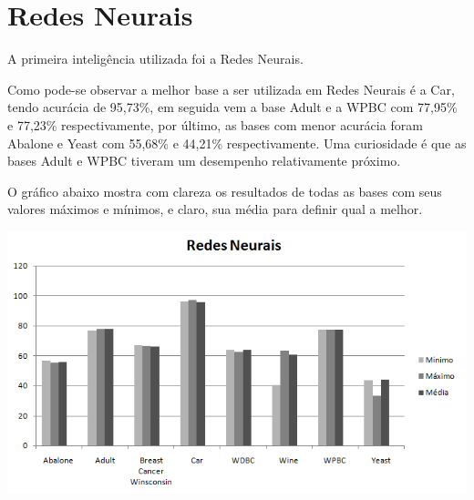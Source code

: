 \section{Redes Neurais}
\label{sec:redesneurais}

A primeira inteligência utilizada foi a Redes Neurais.

Como pode-se observar a melhor base a ser utilizada em Redes Neurais é a Car, tendo acurácia de 95,73\%, em seguida vem a base Adult e a WPBC com 77,95\% e 77,23\% respectivamente, por último, as bases com menor acurácia foram Abalone e Yeast com 55,68\% e 44,21\% respectivamente. Uma curiosidade é que as bases Adult e WPBC tiveram um desempenho relativamente próximo.

O gráfico abaixo mostra com clareza os resultados de todas as bases com seus valores máximos e mínimos, e claro, sua média para definir qual a melhor.

\begin{center}
      \includegraphics[scale=1.0]{imagens/redesneurais.png}
\end{center}
 
